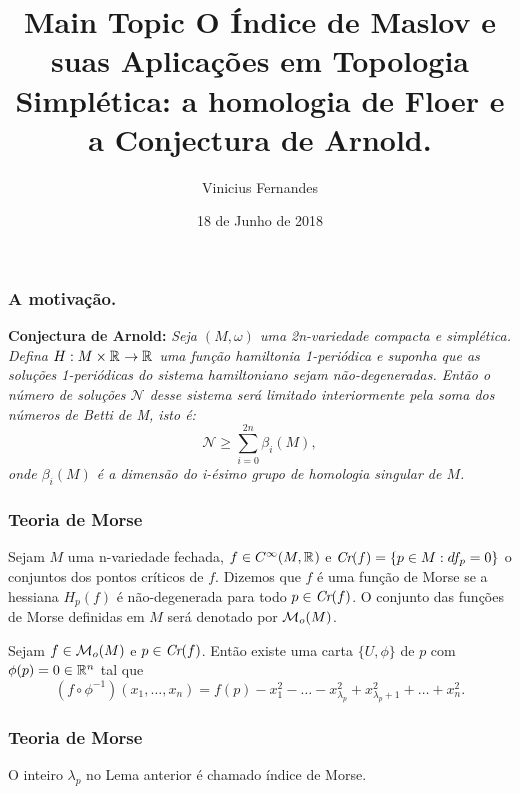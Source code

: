 \documentclass{beamer}
\title[Short title]{Main Topic } %
\author{Vinicius Fernandes}
\title{O Índice de Maslov e suas Aplicações em Topologia Simplética: a homologia de Floer e a Conjectura de Arnold.}
\institute{Universidade Federal do ABC}
\date{18 de Junho de 2018}
\begin{document}
	
	\begin{frame}
		\titlepage %
	\end{frame}
	
\begin{footnotesize}
	
	\begin{frame}
		\frametitle{
			A motivação.}
		
		\textbf{Conjectura de Arnold:} \textit	{Seja $(M,\omega)$ uma 2n-variedade compacta e simplética. Defina  $H:M\times \mathbb{R}^{} \to \mathbb{R}^{}$  uma função hamiltonia 1-periódica e suponha que as soluções 1-periódicas do sistema hamiltoniano sejam não-degeneradas. Então o número de soluções $\mathcal{N}$ desse sistema será limitado interiormente pela soma dos números de Betti de M, isto é:
			$$
			\mathcal{N}\geq \sum_{i=0}^{2n}\beta_{i}(M),
			$$
			onde $\beta_{i}(M)$ é a dimensão do i-ésimo grupo de homologia singular de $M$.}
	\end{frame}
	\begin{frame}
		\frametitle{Teoria de Morse}
		\begin{definicao}
			Sejam $M$ uma n-variedade fechada, $f \in C^{\infty}(M, \mathbb{R}^{})$ e $\textit{Cr}(f) = \{p \in M: df_{p} = 0\}$ o conjuntos dos pontos críticos de $f$. Dizemos que $f$ é uma função de Morse se a hessiana $H_{p}(f)$ é não-degenerada para todo $p \in \textit{Cr}(f)$. O conjunto das funções de Morse definidas em $M$ será denotado por $\mathcal{M}_{o}(M)$. 
		\end{definicao}
		\begin{lema}
			Sejam $f \in \mathcal{M}_{o}(M)$ e $p \in \textit{Cr}(f)$. Então existe uma carta $\{U, \phi\}$ de $p$ com $\phi(p)=0 \in \mathbb{R}^{n}$ tal que 
			$$
			(f\circ \phi^{-1})(x_{1}, \dots, x_{n}) = f(p)-x_{1}^{2}-\dots -x^{2}_{\lambda_{p}}+x^{2}_{\lambda_{p}+1}+\dots + x^{2}_{n}.
			$$
		\end{lema}
	\end{frame}
	
	\begin{frame}
		
		\frametitle{Teoria de Morse}
		\begin{definicao}
			O inteiro $\lambda_{p}$ no Lema anterior é chamado índice de Morse.
		\end{definicao}
		

\end{frame}
\end{footnotesize}
\end{document}
